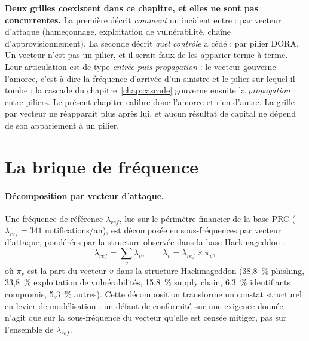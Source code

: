 
\begin{attention}
\textbf{Deux grilles coexistent dans ce chapitre, et elles ne sont pas concurrentes.} La
première décrit \emph{comment} un incident entre : par vecteur d'attaque (hameçonnage,
exploitation de vulnérabilité, chaîne d'approvisionnement). La seconde décrit \emph{quel
contrôle} a cédé : par pilier DORA. Un vecteur n'est pas un pilier, et il serait faux
de les apparier terme à terme. Leur articulation est de type \emph{entrée puis propagation} :
le vecteur gouverne l'amorce, c'est-à-dire la fréquence d'arrivée d'un sinistre et le
pilier sur lequel il tombe ; la cascade du chapitre~\ref{chap:cascade} gouverne ensuite la
\emph{propagation} entre piliers. Le présent chapitre calibre donc l'amorce et rien d'autre.
La grille par vecteur ne réapparaît plus après lui, et aucun résultat de capital ne dépend de
son appariement à un pilier.
\end{attention}

\section{La brique de fréquence}

\paragraph{Décomposition par vecteur d'attaque.} Une fréquence de référence
$\lambda_{ref}$, lue sur le périmètre financier de la base PRC
($\lambda_{ref} = 341$ notifications/an), est décomposée en
sous-fréquences par vecteur d'attaque,
pondérées par la structure observée dans la base Hackmageddon :
\begin{equation}
\lambda_{ref} = \sum_{v} \lambda_v,
\qquad
\lambda_v = \lambda_{ref} \times \pi_v,
\end{equation}
où $\pi_v$ est la part du vecteur $v$ dans la structure Hackmageddon
(38{,}8~\% phishing, 33{,}8~\% exploitation de vulnérabilités, 15{,}8~\%
supply chain, 6{,}3~\% identifiants compromis, 5{,}3~\% autres). Cette
décomposition transforme un constat structurel en levier de modélisation :
un défaut de conformité sur une exigence donnée n'agit que sur la
sous-fréquence du vecteur qu'elle est censée mitiger, pas sur l'ensemble de
$\lambda_{ref}$.

